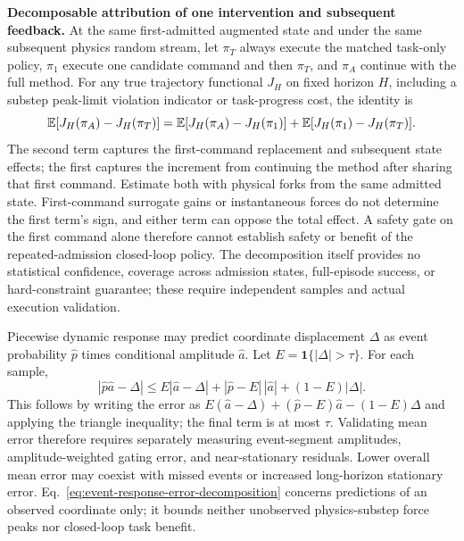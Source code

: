 \textbf{Decomposable attribution of one intervention and subsequent feedback.} At the same first-admitted augmented state and
under the same subsequent physics random stream, let $\pi_T$ always execute the matched task-only policy,
$\pi_1$ execute one candidate command and then $\pi_T$, and $\pi_A$ continue
with the full method. For any true trajectory functional $J_H$ on fixed horizon $H$, including a substep peak-limit
violation indicator or task-progress cost, the identity is
\[
 \mathbb E[J_H(\pi_A)-J_H(\pi_T)]
 =\mathbb E[J_H(\pi_A)-J_H(\pi_1)]
  +\mathbb E[J_H(\pi_1)-J_H(\pi_T)].
\]
The second term captures the first-command replacement and subsequent state effects; the first captures the increment from continuing
the method after sharing that first command. Estimate both with physical forks from the same admitted state.
First-command surrogate gains or instantaneous forces do not determine the first term's sign, and either term can oppose
the total effect. A safety gate on the first command alone therefore cannot establish safety or benefit of the
repeated-admission closed-loop policy. The decomposition itself provides no statistical confidence, coverage across admission states,
full-episode success, or hard-constraint guarantee; these require independent samples and actual execution validation.

Piecewise dynamic response may predict coordinate displacement $\Delta$ as event probability $\widehat p$ times conditional amplitude $\widehat a$.
Let $E=\mathbf 1\{|\Delta|>\tau\}$. For each sample,
\begin{equation}
 |\widehat p\widehat a-\Delta|
 \le E|\widehat a-\Delta|
     +|\widehat p-E|\,|\widehat a|
     +(1-E)|\Delta|.
 \label{eq:event-response-error-decomposition}
\end{equation}
This follows by writing the error as $E(\widehat a-\Delta)+(\widehat p-E)\widehat a
-(1-E)\Delta$ and applying the triangle inequality; the final term is at most $\tau$.
Validating mean error therefore requires separately measuring event-segment amplitudes, amplitude-weighted gating error, and near-stationary
residuals. Lower overall mean error may coexist with missed events or increased long-horizon stationary error.
Eq.~\eqref{eq:event-response-error-decomposition} concerns predictions of an observed coordinate only;
it bounds neither unobserved physics-substep force peaks nor closed-loop task benefit.

